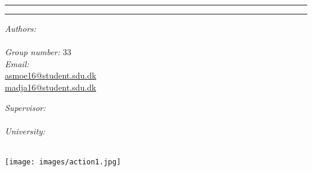 \documentclass[../main.tex]{subfiles}
\begin{document}
\vspace{3cm}
\hrule
\begin{center}
	{\bf\Huge\Title}
\end{center}
\hrule
\begin{multicols}{2}
	\begin{flushleft}
		\textit{Authors:} \\
		\Author\\
		\vspace{10pt}
		\textit{Group number:} 33\\
		\vspace{10pt}
		\textit{Email:} \\
		\href{asmoe16@student.sdu.dk}{asmoe16@student.sdu.dk}\\
		\href{madja16@student.sdu.dk}{madja16@student.sdu.dk}

	\end{flushleft}
	\columnbreak
	\begin{flushright}
		\textit{Supervisor:} \\
		\Supervisor \\
		\vspace{10pt} 
		\textit{University:}\\
		\University \\
	\end{flushright}
\end{multicols}

\begin{center}
	\texttt{[image: images/action1.jpg]}
\end{center}
\end{document}
